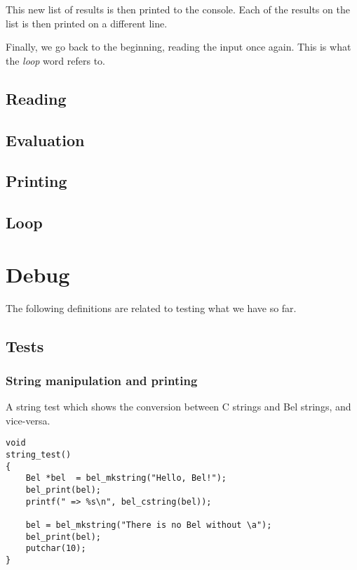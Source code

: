\documentclass[openright,a4paper,twoside,12pt]{memoir}
\begin{document}
This new list of  results is then printed to the  console. Each of the
results on the list is then printed on a different line.

Finally,  we  go back  to  the  beginning,  reading the  input  once
again. This is what the \emph{loop} word refers to.

\section{Reading}
\label{sec:orgc91e568}

\section{Evaluation}
\label{sec:orgc3a06ae}

\section{Printing}
\label{sec:org6d9a427}

\section{Loop}
\label{sec:orgfd359bd}

\chapter{Debug}
\label{sec:org08e31fe}

The following definitions are related to testing what we have so
far.

\section{Tests}
\label{sec:org7e6ca80}
\subsection{String manipulation and printing}
\label{sec:orga0118d7}

A string test which shows the conversion between C strings and Bel
strings, and vice-versa.

\begin{verbatim}
void
string_test()
{
    Bel *bel  = bel_mkstring("Hello, Bel!");
    bel_print(bel);
    printf(" => %s\n", bel_cstring(bel));

    bel = bel_mkstring("There is no Bel without \a");
    bel_print(bel);
    putchar(10);
}
\end{verbatim}
\end{document}
